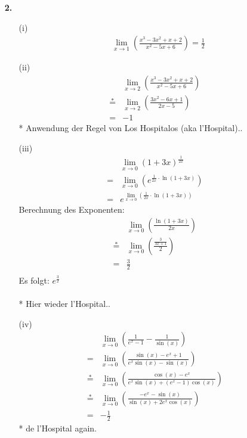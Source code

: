 \documentclass[a4paper,11pt,fleqn]{scrartcl}
\begin{document}
\begin{enumerate}
\item[\textbf{2.}]
    \begin{enumerate}
        \item[(i)]
            \begin{align*}
                &\underset{x \to 1}{\lim} \left( \frac{x^3-3x^2+x+2}{x^2-5x+6} \right) = \frac{1}{2}
            \end{align*}
        \item[(ii)]
            \begin{align*}
                &\underset{x \to 2}{\lim} \left( \frac{x^3-3x^2+x+2}{x^2-5x+6} \right)\\
                \overset{*}{=}&\underset{x \to 2}{\lim} \left( \frac{3x^2-6x+1}{2x-5} \right)\\
                =& -1
            \end{align*}
            * Anwendung der Regel von Los Hospitalos (aka l'Hospital)..
        \item[(iii)]
            \begin{align*}
                &\underset{x \to 0}{\lim} (1+3x)^{\frac{1}{2x}}\\
                =&\underset{x \to 0}{\lim} \left( e^{\frac{1}{2x} \cdot \ln(1+3x)} \right)\\
                =&e^{\underset{x \to 0}{\lim} \left( \frac{1}{2x} \cdot \ln(1+3x) \right)}
            \end{align*}
            Berechnung des Exponenten:
            \begin{align*}
                &\underset{x \to 0}{\lim} \left( \frac{\ln(1+3x)}{2x} \right)\\
                \overset{*}{=}&\underset{x \to 0}{\lim} \left( \frac{\frac{3}{3x+1}}{2} \right)\\
                =& \frac{3}{2}\\
            \end{align*}
                Es folgt: $e^{\frac{3}{2}}$\\\\
            * Hier wieder l'Hospital..
        \item[(iv)]
            \begin{align*}
                &\underset{x \to 0}{\lim} \left( \frac{1}{e^x -1}-\frac{1}{\sin(x)} \right)\\
                =&\underset{x \to 0}{\lim} \left( \frac{\sin(x) - e^x + 1}{e^x \sin(x) - \sin(x)} \right)\\
                \overset{*}{=}&\underset{x \to 0}{\lim} \left( \frac{\cos(x) - e^x}{e^x \sin(x) +(e^x -1) \cos(x)} \right)\\
                \overset{*}{=}&\underset{x \to 0}{\lim} \left( \frac{-e^x - \sin(x)}{\sin(x) +2e^x \cos(x)} \right)\\
                =& -\frac{1}{2}
            \end{align*}
            * de l'Hospital again.
    \end{enumerate}


\end{enumerate}
\end{document}
